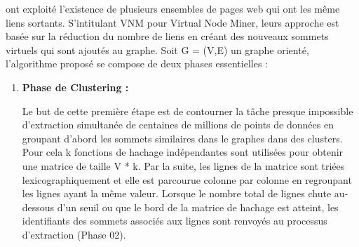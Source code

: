 				\citep{buehrer2008scalable} ont exploité l'existence de plusieurs ensembles de pages web qui ont les même liens sortants. S'intitulant  VNM pour Virtual Node Miner, leurs approche est basée sur la réduction du nombre de liens en créant des nouveaux sommets virtuels qui sont ajoutés au graphe. Soit G = (V,E) un graphe orienté, l'algorithme proposé se compose de deux phases essentielles :
				\begin{enumerate}
				
				
					\item \textbf{Phase de Clustering :}
					
					Le but de cette première étape est de contourner la tâche presque impossible d'extraction simultanée de centaines de millions de points de données en groupant d'abord les sommets similaires dans le graphes dans des clusters. 
				Pour cela k fonctions de hachage indépendantes sont utilisées pour obtenir une matrice de taille V * k. Par la suite, les lignes de la matrice  sont triées lexicographiquement
				et elle est parcourue colonne par colonne en regroupant les lignes ayant la même valeur. Lorsque le nombre total de lignes chute au-dessous d'un seuil ou que le bord de la matrice de hachage est atteint, les identifiants des sommets associés aux lignes sont renvoyés au processus d'extraction (Phase 02). 
					

\end{enumerate}
